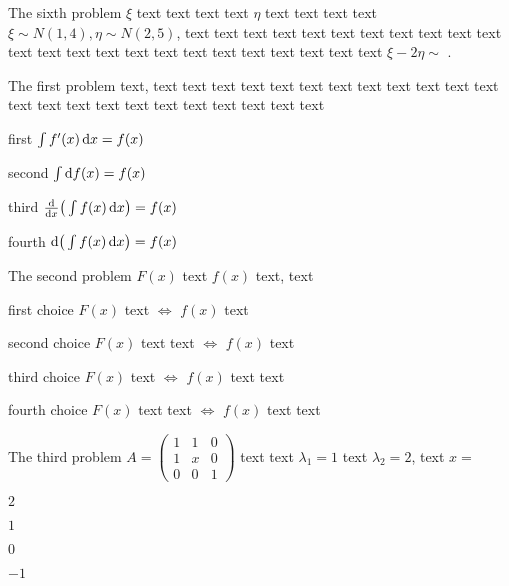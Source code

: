 \documentclass[12pt,most]{randexam}
\begin{document}
\bigskip

\begin{problem}
The sixth problem $\xi$ text text text text $\eta$ text text text text $\xi\sim N(1,4),
\eta\sim N(2,5)$, text text text text text text text text text text text text text text
text text text text text text text text text text $\xi-2\eta\sim$ .
\end{problem}

\bigskip

\newpage



\begin{problem}
The first problem text, text text text text text text text text text text
text text text text text text text text text text text text text 
\begin{abcd}
\item first $\int f'(x)\mathop{}\!\mathrm{d} x=f(x)$
\item second $\int \d f(x)=f(x)$
\item third $\frac{\d}{\dx}\big(\int f(x)\dx\big)=f(x)$
\item fourth $\d\big(\int f(x)\dx\big)=f(x)$
\end{abcd}
\end{problem}

\bigskip

\begin{problem}
The second problem $F(x)$ text $f(x)$ text, text 
\begin{abcd}
\item first choice $F(x)$ text $\Leftrightarrow$ $f(x)$ text
\item second choice $F(x)$ text text $\Leftrightarrow$ $f(x)$ text
\item third choice $F(x)$ text $\Leftrightarrow$ $f(x)$ text text
\item fourth choice $F(x)$ text text $\Leftrightarrow$ $f(x)$ text text
\end{abcd}
\end{problem}

\bigskip

\begin{problem}
The third problem $A = \left(\begin{array}{ccc}
  1 & 1 & 0\\
  1 & x & 0\\
  0 & 0 & 1
\end{array}\right)$ text text $\lambda_1 = 1$ text $\lambda_2
= 2$, text $x=$ 
\begin{abcd}
\item $2$
\item $1$
\item $0$
\item $-1$
\end{abcd}
\end{problem}
\end{document}
